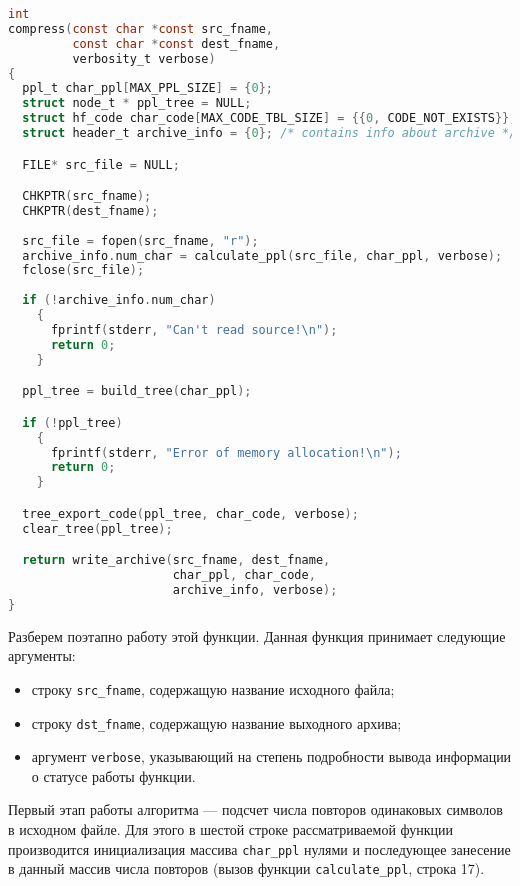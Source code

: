 \begin{lstlisting}[basicstyle=\scriptsize\ttfamily,
                   numberstyle=\scriptsize\ttfamily,
                   xleftmargin=7mm,
                   language=C,caption=Функция сжатия данных compress,
                   label=lst:compress]
int
compress(const char *const src_fname,
         const char *const dest_fname,
         verbosity_t verbose)
{
  ppl_t char_ppl[MAX_PPL_SIZE] = {0};
  struct node_t * ppl_tree = NULL; 
  struct hf_code char_code[MAX_CODE_TBL_SIZE] = {{0, CODE_NOT_EXISTS}};
  struct header_t archive_info = {0}; /* contains info about archive */

  FILE* src_file = NULL;

  CHKPTR(src_fname);
  CHKPTR(dest_fname);
  
  src_file = fopen(src_fname, "r");
  archive_info.num_char = calculate_ppl(src_file, char_ppl, verbose);
  fclose(src_file);
  
  if (!archive_info.num_char)
    {
      fprintf(stderr, "Can't read source!\n");
      return 0;
    }

  ppl_tree = build_tree(char_ppl);

  if (!ppl_tree)
    {
      fprintf(stderr, "Error of memory allocation!\n");
      return 0;
    }

  tree_export_code(ppl_tree, char_code, verbose);
  clear_tree(ppl_tree);

  return write_archive(src_fname, dest_fname,
                       char_ppl, char_code,
                       archive_info, verbose);
}
\end{lstlisting}

Разберем поэтапно работу этой функции. 
Данная функция принимает следующие аргументы:
\begin{itemize}
\item строку \texttt{src\_fname}, содержащую название исходного файла;
\item строку \texttt{dst\_fname}, содержащую название выходного архива;
\item аргумент \texttt{verbose}, указывающий на степень подробности вывода
  информации о статусе работы функции.
\end{itemize}

Первый этап работы алгоритма --- подсчет числа повторов одинаковых символов 
в исходном файле. Для этого в шестой строке рассматриваемой функции производится
инициализация массива \texttt{char\_ppl} нулями и последующее занесение 
в данный массив числа повторов (вызов функции \texttt{calculate\_ppl}, строка 17).

